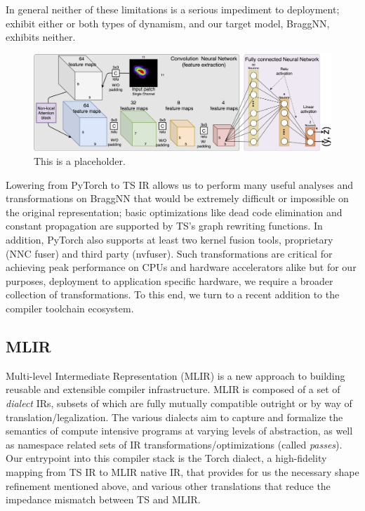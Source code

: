 In general neither of these limitations is a serious impediment to deployment;  exhibit either or both types of dynamism, and our target model, BraggNN, exhibits neither.
\begin{figure}
	\includegraphics[width=\textwidth]{figures/BraggNN}
	\caption{This is a placeholder.}
\end{figure}
Lowering from PyTorch to TS IR allows us to perform many useful analyses and transformations on BraggNN that would be extremely difficult or impossible on the original representation;
basic optimizations like dead code elimination and constant propagation are supported by TS's graph rewriting functions.
In addition, PyTorch also supports at least two kernel fusion\cite{10.1145/2688500.2688521} tools, proprietary (NNC fuser) and third party (nvfuser).
Such transformations are critical for achieving peak performance on CPUs and hardware accelerators alike but for our purposes, deployment to application specific hardware, we require a broader collection of transformations.
To this end, we turn to a recent addition to the compiler toolchain ecosystem.

\subsection{MLIR}\label{subsec:mlir}

Multi-level Intermediate Representation\cite{https://doi.org/10.48550/arxiv.2002.11054} (MLIR) is a new approach to building reusable and extensible compiler infrastructure.
MLIR is composed of a set of \emph{dialect} IRs, subsets of which are fully mutually compatible outright or by way of translation/legalization.
The various dialects aim to capture and formalize the semantics of compute intensive programs at varying levels of abstraction, as well as namespace related sets of IR transformations/optimizations (called \emph{passes}).
Our entrypoint into this compiler stack is the Torch dialect\cite{torch-mlir}, a high-fidelity mapping from TS IR to MLIR native IR, that provides for us the necessary shape refinement mentioned above, and various other translations that reduce the impedance mismatch between TS and MLIR.

